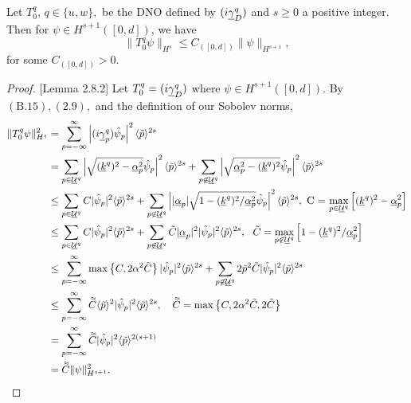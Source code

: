\begin{lemma} Let $T_0^q$, $q\in\{u,w\},$ be the DNO defined by $(i\underline{\gamma}_D^q)$ and $s\geq 0$ a positive integer. Then for $\psi\in H^{s+1}([0,d])$, we have
$$\|T_0^q\psi\|_{H^{s}} \le C_{([0,d])}\|\psi\|_{H^{s+1}},$$
for some $C_{([0,d])}>0$.
\end{lemma}
\vskip 0.1in
\begin{proof}{[Lemma 2.8.2]} Let $T_0^q=(i\underline{\gamma}_D^q)$ where $\psi\in H^{s+1}([0,d])$. By $(\text{B}.15),(2.9),$ and the definition of our Sobolev norms,
\begin{align*}\|T_0^q\psi\|_{H^{s}}^2&=\sum_{p=-\infty}^{\infty}\left|(i\underline{\gamma}_p^q)\hat{\psi}_p\right|^2\langle \tilde{p} \rangle^{2s}\\&=\sum_{p\in \mathcal{\underline{U}}^q}\left|\sqrt{(\underline{k}^q)^2-\underline{\alpha}_p^2}\hat{\psi}_p\right|^2\langle \tilde{p} \rangle^{2s}+ \sum_{p\not\in \mathcal{\underline{U}}^q}\left|\sqrt{\underline{\alpha}_p^2-(\underline{k}^q)^2}\hat{\psi}_p\right|^2\langle \tilde{p} \rangle^{2s} \\&\le \sum_{p\in \mathcal{\underline{U}}^q}C|\hat{\psi}_p|^2\langle \tilde{p} \rangle^{2s}+ \sum_{p\not\in \mathcal{\underline{U}}^q}\left||\underline{\alpha}_p|\sqrt{1-{(\underline{k}^q)^2}/{\underline{\alpha}_p^2}}\hat{\psi}_p\right|^2\langle \tilde{p} \rangle^{2s},~\text{C~=~$\max_{p\in\mathcal{\underline{U}}^q}\Big[(\underline{k}^q)^2-\underline{\alpha}_p^2\Big]$}\\&\le
\sum_{p\in \mathcal{\underline{U}}^q}C|\hat{\psi}_p|^2\langle \tilde{p} \rangle^{2s}+ \sum_{p\not\in \mathcal{\underline{U}}^q}\tilde{C}|\underline{\alpha}_p|^2|\hat{\psi}_p|^2\langle \tilde{p} \rangle^{2s},~~\text{$\tilde{C}=\max_{p\not\in\mathcal{\underline{U}}^q}\Big[1-{(\underline{k}^q)^2}/{\underline{\alpha}_p^2}\Big]$}\\&\le
\sum_{p=-\infty}^{\infty}\max\left\{C,2\alpha^2\tilde{C}\right\}|\hat{\psi}_p|^2\langle \tilde{p} \rangle^{2s} + \sum_{p\not\in \mathcal{\underline{U}}^q}2\tilde{p}^2\tilde{C}|\hat{\psi}_p|^2\langle \tilde{p} \rangle^{2s}
\\&\leq
\sum_{p=-\infty}^{\infty}{\accentset{\approx}{C}}\langle \tilde{p} \rangle^2|\hat{\psi}_p|^2\langle \tilde{p} \rangle^{2s},\quad \text{${\accentset{\approx}{C}}=\max\left\{C,2\alpha^2\tilde{C},2\tilde{C}\right\}$}\\&=
\sum_{p=-\infty}^{\infty}{\accentset{\approx}{C}}|\hat{\psi}_p|^2\langle \tilde{p} \rangle^{2(s+1)}\\&=
{\accentset{\approx}{C}}\|\psi\|_{H^{s+1}}^2.
\end{align*}
\end{proof}

